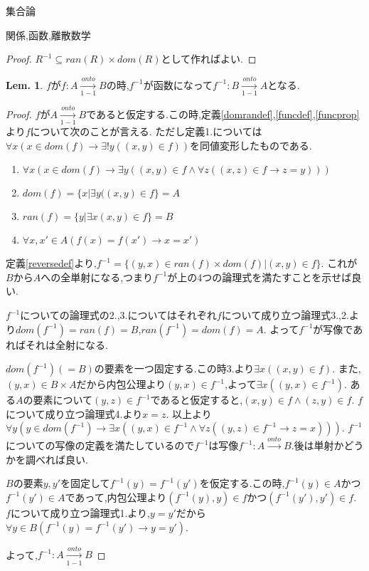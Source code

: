 \documentclass[14pt]{jsarticle}
\theoremstyle{definition}
\newtheorem{lem}[dfn]{Lem.}
\begin{document}
\begin{section}{集合論}
\begin{subsection}{関係,函数,離散数学}
\begin{proof}
$R^{-1} \subseteq ran(R)\times dom(R)$として作ればよい.
\end{proof}
\begin{lem}
\label{homomorphizm}
$f$が$f:A \xrightarrow[1-1]{onto} B$の時,$f^{-1}$が函数になって$f^{-1}:B \xrightarrow[1-1]{onto} A$となる.
\end{lem}
\begin{proof}
$f$が$A\xrightarrow[1-1]{onto}B$であると仮定する.この時,定義\ref{domrandef},\ref{funcdef},\ref{funcprop}より$f$について次のことが言える.
ただし定義1.については$\forall x (x\in dom(f) \to \exists !y((x,y)\in f))$を同値変形したものである.
\begin{enumerate}
	\item $\forall x (x\in dom(f) \to \exists y ((x,y)\in f \land \forall z((x,z) \in f \to z=y)))$
	\item $dom(f)=\{x|\exists y((x,y)\in f\}=A$
	\item $ran(f)=\{y|\exists x(x,y)\in f\}=B$
	\item $\forall x,x'\in A(f(x)=f(x') \to x=x')$
\end{enumerate}
定義\ref{reversedef}より,$f^{-1}=\{(y,x)\in ran(f)\times dom(f)|(x,y)\in f\}$.
これが$B$から$A$への全単射になる,つまり$f^{-1}$が上の4つの論理式を満たすことを示せば良い.\par
$f^{-1}$についての論理式の2.,3.についてはそれぞれ$f$について成り立つ論理式3.,2.より$dom(f^{-1})=ran(f)=B$,$ran(f^{-1})=dom(f)=A$.
よって$f^{-1}$が写像であればそれは全射になる.\par
$dom(f^{-1})(=B)$の要素を一つ固定する.この時3.より$\exists x ((x,y)\in f)$.
また,$(y,x)\in B\times A$だから内包公理より$(y,x)\in f^{-1}$,よって$\exists x((y,x)\in f^{-1})$.
ある$A$の要素について$(y,z)\in f^{-1}$であると仮定すると,$(x,y)\in f \land (z,y) \in f$.
$f$について成り立つ論理式4.より$x=z$.
以上より$\forall y(y\in dom(f^{-1}) \to \exists x((y,x)\in f^{-1} \land \forall z((y,z)\in f^{-1} \to z=x)))$.
$f^{-1}$についての写像の定義を満たしているので$f^{-1}$は写像$f^{-1}:A\xrightarrow{onto}B$.後は単射かどうかを調べれば良い.\par
$B$の要素$y,y'$を固定して$f^{-1}(y)=f^{-1}(y')$を仮定する.この時,$f^{-1}(y)\in A$かつ$f^{-1}(y') \in A$であって,内包公理より$(f^{-1}(y),y)\in f$かつ$(f^{-1}(y'),y')\in f$.
$f$について成り立つ論理式1.より,$y=y'$だから$\forall y\in B(f^{-1}(y)=f^{-1}(y')\to y=y')$.\par
よって,$f^{-1}:A\xrightarrow[1-1]{onto}B$
\end{proof}

\end{subsection}
\end{section}
\end{document}
